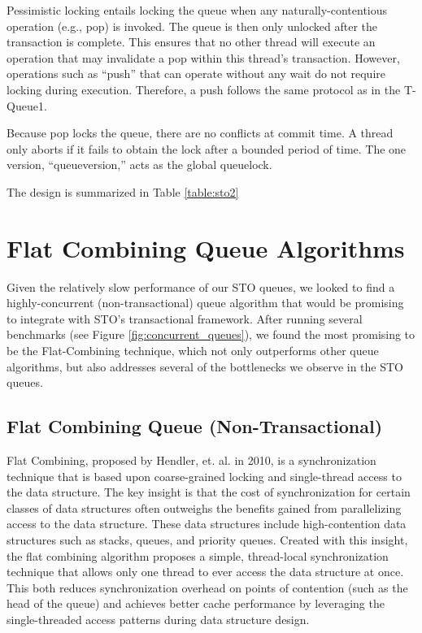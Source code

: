 Pessimistic locking entails locking the queue when any naturally-contentious operation (e.g., pop) is invoked. The queue is then only unlocked after the transaction is complete. This ensures that no other thread will execute an operation that may invalidate a pop within this thread's transaction. However, operations such as ``push'' that can operate without any wait do not require locking during execution. Therefore, a push follows the same protocol as in the T-Queue1.

Because pop locks the queue, there are no conflicts at commit time. A thread only aborts if it fails to obtain the lock after a bounded period of time. The one version, “queueversion,” acts as the global queuelock. 

The design is summarized in Table \ref{table:sto2}


\section{Flat Combining Queue Algorithms}
Given the relatively slow performance of our STO queues, we looked to find a highly-concurrent (non-transactional) queue algorithm that would be promising to integrate with STO's transactional framework. After running several benchmarks (see Figure \ref{fig:concurrent_queues}), we found the most promising to be the Flat-Combining technique, which not only outperforms other queue algorithms, but also addresses several of the bottlenecks we observe in the STO queues.

\subsection{Flat Combining Queue (Non-Transactional)}
\label{fcqueuent}


Flat Combining, proposed by Hendler, et. al. in 2010\cite{flatcombining}, is a synchronization technique that is based upon coarse-grained locking and single-thread access to the data structure. The key insight is that the cost of synchronization for certain classes of data structures often outweighs the benefits gained from parallelizing access to the data structure. These data structures include high-contention data structures such as stacks, queues, and priority queues. Created with this insight, the flat combining algorithm proposes a simple, thread-local synchronization technique that allows only one thread to ever access the data structure at once. This both reduces synchronization overhead on points of contention (such as the head of the queue) and achieves better cache performance by leveraging the single-threaded access patterns during data structure design.

